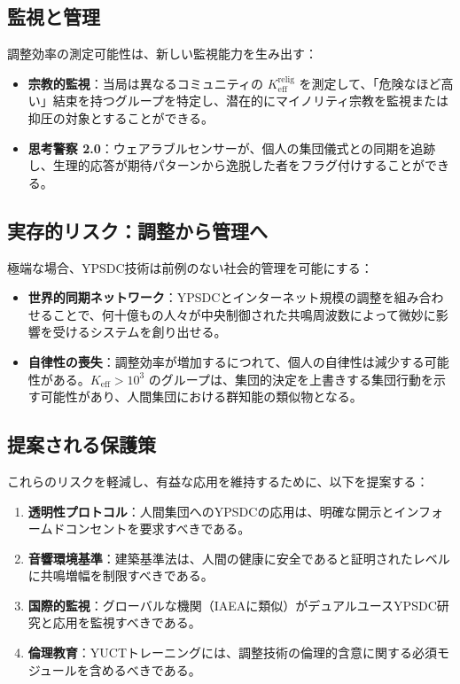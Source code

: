 \documentclass[12pt,a4paper]{article}
\begin{document}
	\subsection{監視と管理}
	
	調整効率の測定可能性は、新しい監視能力を生み出す：
	\begin{itemize}
		\item \textbf{宗教的監視}：当局は異なるコミュニティの $K_{\mathrm{eff}}^{\mathrm{relig}}$ を測定して、「危険なほど高い」結束を持つグループを特定し、潜在的にマイノリティ宗教を監視または抑圧の対象とすることができる。
		
		\item \textbf{思考警察 2.0}：ウェアラブルセンサーが、個人の集団儀式との同期を追跡し、生理的応答が期待パターンから逸脱した者をフラグ付けすることができる。
	\end{itemize}
	
	\subsection{実存的リスク：調整から管理へ}
	
	極端な場合、YPSDC技術は前例のない社会的管理を可能にする：
	\begin{itemize}
		\item \textbf{世界的同期ネットワーク}：YPSDCとインターネット規模の調整を組み合わせることで、何十億もの人々が中央制御された共鳴周波数によって微妙に影響を受けるシステムを創り出せる。
		
		\item \textbf{自律性の喪失}：調整効率が増加するにつれて、個人の自律性は減少する可能性がある。\(K_{\mathrm{eff}} > 10^3\) のグループは、集団的決定を上書きする集団行動を示す可能性があり、人間集団における群知能の類似物となる。
	\end{itemize}
	
	\subsection{提案される保護策}
	
	これらのリスクを軽減し、有益な応用を維持するために、以下を提案する：
	\begin{enumerate}
		\item \textbf{透明性プロトコル}：人間集団へのYPSDCの応用は、明確な開示とインフォームドコンセントを要求すべきである。
		
		\item \textbf{音響環境基準}：建築基準法は、人間の健康に安全であると証明されたレベルに共鳴増幅を制限すべきである。
		
		\item \textbf{国際的監視}：グローバルな機関（IAEAに類似）がデュアルユースYPSDC研究と応用を監視すべきである。
		
		\item \textbf{倫理教育}：YUCTトレーニングには、調整技術の倫理的含意に関する必須モジュールを含めるべきである。
	\end{enumerate}
	
\end{document}
